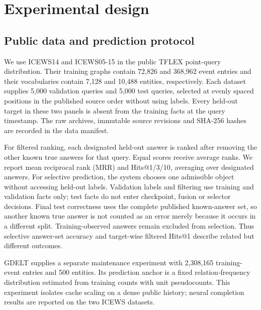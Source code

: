 \section{Experimental design}
\subsection{Public data and prediction protocol}
We use ICEWS14 and ICEWS05-15 in the public TFLEX point-query distribution. Their training graphs contain 72,826 and 368,962 event entries and their vocabularies contain 7,128 and 10,488 entities, respectively. Each dataset supplies 5,000 validation queries and 5,000 test queries, selected at evenly spaced positions in the published source order without using labels. Every held-out target in these two panels is absent from the training facts at the query timestamp. The raw archives, immutable source revisions and SHA-256 hashes are recorded in the data manifest.

For filtered ranking, each designated held-out answer is ranked after removing the other known true answers for that query. Equal scores receive average ranks. We report mean reciprocal rank (MRR) and Hits@1/3/10, averaging over designated answers. For selective prediction, the system chooses one admissible object without accessing held-out labels. Validation labels and filtering use training and validation facts only; test facts do not enter checkpoint, fusion or selector decisions. Final test correctness uses the complete published known-answer set, so another known true answer is not counted as an error merely because it occurs in a different split. Training-observed answers remain excluded from selection. Thus selective answer-set accuracy and target-wise filtered Hits@1 describe related but different outcomes.

GDELT supplies a separate maintenance experiment with 2,308,165 training-event entries and 500 entities. Its prediction anchor is a fixed relation-frequency distribution estimated from training counts with unit pseudocounts. This experiment isolates cache scaling on a dense public history; neural completion results are reported on the two ICEWS datasets.

